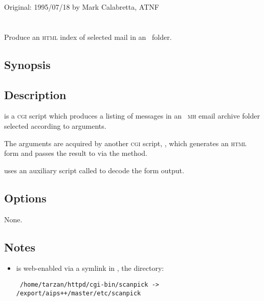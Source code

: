 Original: 1995/07/18 by Mark Calabretta, ATNF


\newpage
\section{}
\label{scanpick}

Produce an \textsc{html} index of selected mail in an \aipspp\ folder.

\subsection*{Synopsis}

\begin{synopsis}
\end{synopsis}

\subsection*{Description}

 is a \textsc{cgi} script which produces a 
listing of messages in an \aipspp\ \textsc{mh} email archive folder selected
according to  arguments.

The  arguments are acquired by another \textsc{cgi} script,
, which generates an \textsc{html} form and passes the result
to  via the  method.

 uses an auxiliary  script called
 to decode the form output.

\subsection*{Options}

None.

\subsection*{Notes}

\begin{itemize}
\item
    is web-enabled via a symlink in
   , the  
   directory:

\begin{verbatim}
 /home/tarzan/httpd/cgi-bin/scanpick -> /export/aips++/master/etc/scanpick
\end{verbatim}
\end{itemize}

